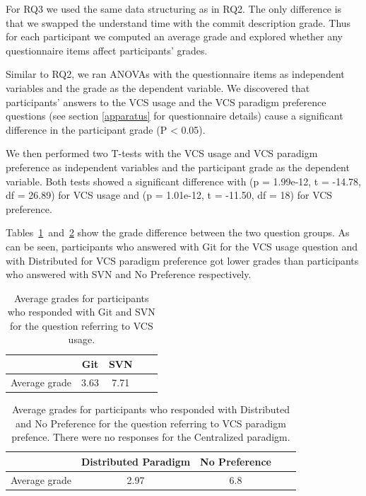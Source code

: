 \documentclass[letterpaper]{article}
\begin{document}
For RQ3 we used the same data structuring as in RQ2.
The only difference is that we swapped the understand time with the commit description grade.
Thus for each participant we computed an average grade and explored whether any questionnaire items affect participants' grades.


Similar to RQ2, we ran ANOVAs with the questionnaire items as independent variables and the grade as the dependent variable. 
We discovered that participants' answers to the VCS usage and the VCS paradigm preference questions (see section \ref{apparatus} for questionnaire details) cause a significant difference in the participant grade (P \textless{} 0.05).

We then performed two T-tests with the VCS usage and VCS paradigm preference as independent variables and the participant grade as the dependent variable.
Both tests showed a significant difference with (p = 1.99e-12, t = -14.78, df = 26.89) for VCS usage and (p = 1.01e-12, t = -11.50, df = 18) for VCS preference.

Tables~\ref{tab:rq3_vcsUsage}~and~\ref{tab:rq3_vcsPreference} show the grade difference between the two question groups.
As can be seen, participants who answered with Git for the VCS usage question and with Distributed for VCS paradigm preference got lower grades than participants who answered with SVN and No Preference respectively.

\begin{table}[h]
	\centering
	\begin{tabular}{c | c c c c}
										& Git  & SVN \\ \hline
	Average grade & 3.63 & 7.71
	\end{tabular}
	\caption{Average grades for participants who responded with Git and SVN for the question referring to VCS usage.}
	\label{tab:rq3_vcsUsage}
\end{table}

\begin{table}[h]
	\centering
	\begin{tabular}{c | c c c c}
							& Distributed Paradigm  & No Preference \\ \hline
	Average grade & 2.97 & 6.8 
	\end{tabular}
	\caption{Average grades for participants who responded with Distributed and No Preference for the question referring to VCS paradigm prefence. There were no responses for the Centralized paradigm.}
	\label{tab:rq3_vcsPreference}
\end{table}
\end{document}
